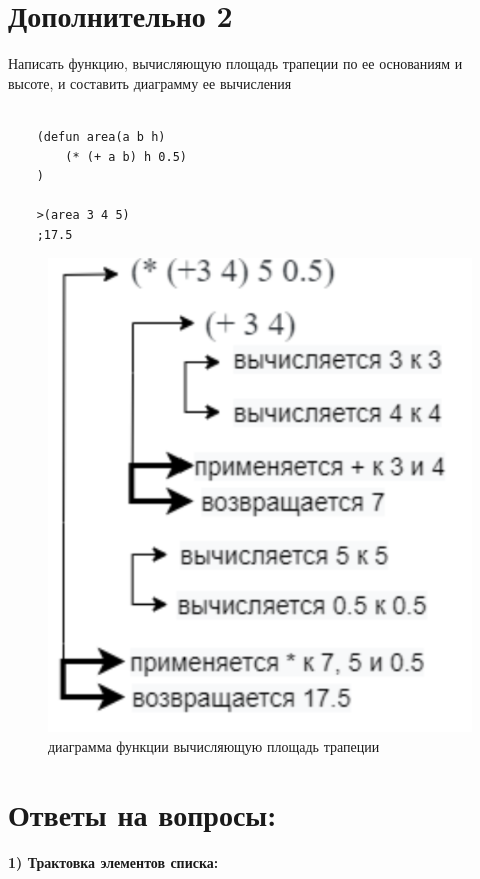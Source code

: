 \documentclass[a4paper, 12pt]{article}
\begin{document}
\section*{Дополнительно 2}
Написать функцию, вычисляющую площадь трапеции по ее основаниям и высоте, и составить диаграмму ее вычисления\\ \\
\begin{lstlisting}
	(defun area(a b h)
		(* (+ a b) h 0.5)
	)
	
	>(area 3 4 5)
	;17.5
\end{lstlisting}
\begin{figure}[h!]
	\centering \includegraphics[scale=0.8]{dop2}
	\centering\caption{диаграмма функции вычисляющую площадь трапеции}
\end{figure}

\section*{Ответы на вопросы:}
\hspace*{-7mm} \textbf{1) Трактовка элементов списка:}
\end{document}
